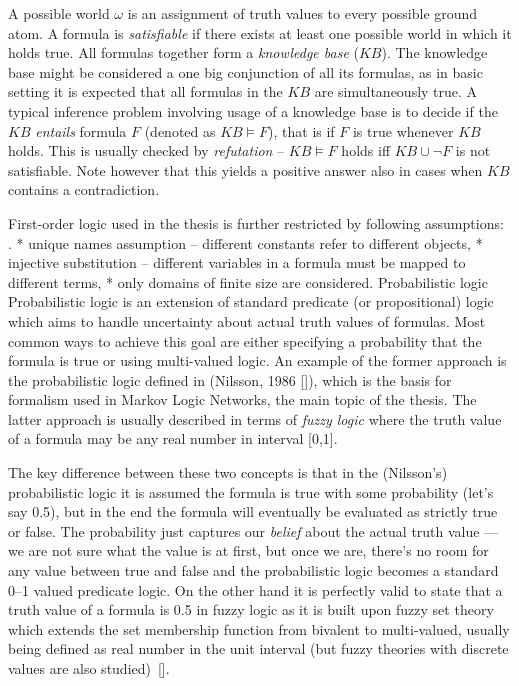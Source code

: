 \par 
A possible world $\omega$ is an assignment of truth values to every possible ground atom. A formula is {\em satisfiable} if there exists at least one possible world in which it holds true. All formulas together form a {\em knowledge base} ($KB$). The knowledge base might be considered a one big conjunction of all its formulas, as in basic setting it is expected that all formulas in the $KB$ are simultaneously true. A typical inference problem involving usage of a knowledge base is to decide if the $KB$ {\em entails} formula $F$ (denoted as $KB \models F$), that is if $F$ is true whenever $KB$ holds. This is usually checked by {\em refutation} -- $KB \models F$ holds iff $KB \cup \neg F$ is not satisfiable. Note however that this yields a positive answer also in cases when $KB$ contains a contradiction.
\par 
First-order logic used in the thesis is further restricted by following assumptions:
\begitems \style .
* unique names assumption -- different constants refer to different objects,
* injective substitution -- different variables in a formula must be mapped to different terms,
* only domains of finite size are considered.
\enditems
\secc Probabilistic logic
Probabilistic logic is an extension of standard predicate (or propositional) logic which aims to handle uncertainty about actual truth values of formulas. Most common ways to achieve this goal are either specifying a probability that the formula is true or using multi-valued logic. An example of the former approach is the probabilistic logic defined in (Nilsson, 1986 [\rcite[Nilsson1986]]), which is the basis for formalism used in Markov Logic Networks, the main topic of the thesis. The latter approach is usually described in terms of {\it fuzzy logic} where the truth value of a formula may be any real number in interval [0,1]. 

\par The key difference between these two concepts is that in the (Nilsson's) probabilistic logic it is assumed the formula is true with some probability (let's say 0.5), but in the end the formula will eventually be evaluated as strictly true or false. The probability just captures our {\it belief} about the actual truth value --- we are not sure what the value is at first, but once we are, there's no room for any value between true and false and the probabilistic logic becomes a standard 0--1 valued predicate logic. On the other hand it is perfectly valid to state that a truth value of a formula is 0.5 in fuzzy logic as it is built upon fuzzy set theory which extends the set membership function from bivalent to multi-valued, usually being defined as real number in the unit interval (but fuzzy theories with discrete values are also studied)~[\rcite[Zadeh1965]]. 

